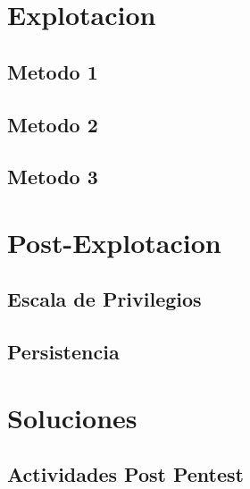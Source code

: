 \documentclass[a4paper]{article}%
\begin{document}
	\section{Explotacion}

	\subsection{Metodo 1}

	\subsection{Metodo 2}

	\subsection{Metodo 3}

	\section{Post-Explotacion}

	\subsection{Escala de Privilegios}

	\subsection{Persistencia}

	\section{Soluciones}
		
		\subsection{Actividades Post Pentest}

	
\end{document}
